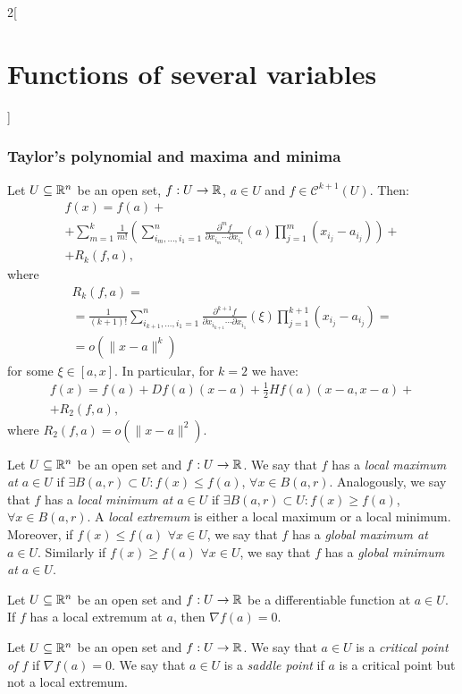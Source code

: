 \documentclass[../../../main.tex]{subfiles}
\begin{document}
\begin{multicols}{2}[\section{Functions of several variables}]
\subsubsection*{Taylor's polynomial and maxima and minima}
\begin{theorem}
Let $U\subseteq\mathbb{R}^n$ be an open set, $f:U\rightarrow\mathbb{R} $, $a\in U$ and $f\in \mathcal{C}^{k+1}(U)$. Then: 
\begin{multline*}
    f(x)=f(a)+\\+\sum_{m=1}^k\frac{1}{m!}\left(\sum_{i_m,\ldots,i_1=1}^n\frac{\partial^mf}{\partial x_{i_m}\cdots\partial x_{i_1}}(a)\prod_{j=1}^m(x_{i_j}-a_{i_j})\right)+\\+R_k(f,a),
\end{multline*} where 
\begin{multline*}
    R_k(f,a)=\\=\frac{1}{(k+1)!}\sum_{i_{k+1},\ldots,i_1=1}^n\frac{\partial^{k+1}f}{\partial x_{i_{k+1}}\cdots\partial x_{i_1}}(\xi)\prod_{j=1}^{k+1}(x_{i_j}-a_{i_j})=\\=o(\|x-a\|^k)
\end{multline*} for some $\xi\in[a,x]$. In particular, for $k=2$ we have: \begin{multline*}
    f(x)=f(a)+Df(a)(x-a)+\frac{1}{2}Hf(a)(x-a,x-a)+\\+R_2(f,a),
\end{multline*} where $R_2(f,a)=o(\|x-a\|^2)$.
\end{theorem}
\begin{definition}
Let $U\subseteq\mathbb{R}^n$ be an open set and $f:U\rightarrow\mathbb{R} $. We say that $f$ has a \textit{local maximum at $a\in U$} if $\exists B(a,r)\subset U:f(x)\leq f(a)$, $\forall x\in B(a,r)$. Analogously, we say that $f$ has a \textit{local minimum at $a\in U$} if $\exists B(a,r)\subset U:f(x)\geq f(a)$, $\forall x\in B(a,r)$. A \textit{local extremum} is either a local maximum or a local minimum. Moreover, if $f(x)\leq f(a)$ $\forall x\in U$, we say that $f$ has a \textit{global maximum at $a\in U$}. Similarly if $f(x)\geq f(a)$ $\forall x\in U$, we say that $f$ has a \textit{global minimum at $a\in U$}.
\end{definition}
\begin{prop}
Let $U\subseteq\mathbb{R}^n$ be an open set and $f:U\rightarrow\mathbb{R} $ be a differentiable function at $a\in U$. If $f$ has a local extremum at $a$, then $\nabla f(a)=0$.
\end{prop}
\begin{definition}
Let $U\subseteq\mathbb{R}^n$ be an open set and $f:U\rightarrow\mathbb{R} $. We say that $a\in U$ is a \textit{critical point of $f$} if $\nabla f(a)=0$. We say that $a\in U$ is a \textit{saddle point} if $a$ is a critical point but not a local extremum.

\end{definition}
\end{multicols}
\end{document}

